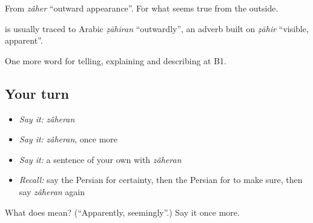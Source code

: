 From \emph{zâher} \textquotedblleft{}outward appearance\textquotedblright{}. For what seems true from the outside.

\begin{cousinweb}
\textbf{} is usually traced to Arabic \emph{ẓāhiran} \textquotedblleft{}outwardly\textquotedblright{}, an adverb built on \emph{ẓāhir} \textquotedblleft{}visible, apparent\textquotedblright{}.
\end{cousinweb}

\begin{grammarlens}[title={What you've built}]
One more word for telling, explaining and describing at B1.
\end{grammarlens}

\subsection*{Your turn}
\begin{itemize}
\raggedright
  \item \emph{Say it:} \emph{zâheran}
  \item \emph{Say it:} \emph{zâheran}, once more
  \item \emph{Say it:} a sentence of your own with \emph{zâheran}
  \item \emph{Recall:} say the Persian for certainty, then the Persian for to make sure, then say \emph{zâheran} again
\end{itemize}

\begin{tcolorbox}[breakable,colback=teal!4,colframe=teal!35!black,title={Before you move on}]
What does  mean? (\textquotedblleft{}Apparently, seemingly\textquotedblright{}.) Say it once more.
\end{tcolorbox}
